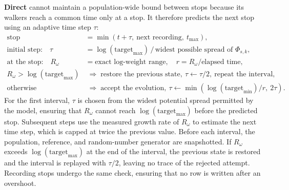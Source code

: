 \documentclass[11pt]{article}
\begin{document}
\textcolor{dircol}{\textbf{Direct}} cannot maintain a population-wide bound between stops because its walkers reach a common time only at a stop. It therefore predicts the next stop using an adaptive time step $\tau$:
\begin{align}
    \text{stop} &= \min(t + \tau,\ \text{next recording},\ t_{\max}), \nonumber\\
    \text{initial step:}\quad \tau &= \log(\text{target}_{\max}) \,/\,
        \text{widest possible spread of $\Phi_{s,k}$}, \nonumber\\
    \text{at the stop:}\quad R_\omega &= \text{exact log-weight range}, \quad
        r = R_\omega / \text{elapsed time}, \nonumber\\
    R_\omega > \log(\text{target}_{\max}) &\;\Rightarrow\; \text{restore the previous state},
        \ \tau \leftarrow \tau/2, \ \text{repeat the interval}, \nonumber\\
    \text{otherwise} &\;\Rightarrow\; \text{accept the evolution},\
        \tau \leftarrow \min\!\left(\log(\text{target}_{\min})/r,\ 2\tau\right).
\end{align}
For the first interval, $\tau$ is chosen from the widest potential spread permitted by the model, ensuring that $R_\omega$ cannot reach $\log(\text{target}_{\max})$ before the predicted stop. Subsequent steps use the measured growth rate of $R_\omega$ to estimate the next time step, which is capped at twice the previous value. Before each interval, the population, reference, and random-number generator are snapshotted. If $R_\omega$ exceeds $\log(\text{target}_{\max})$ at the end of the interval, the previous state is restored and the interval is replayed with $\tau/2$, leaving no trace of the rejected attempt. Recording stops undergo the same check, ensuring that no row is written after an overshoot.
\end{document}
